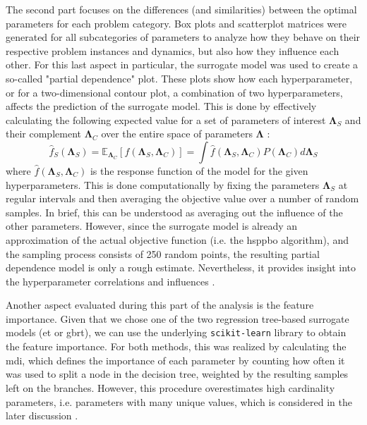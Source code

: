 The second part focuses on the differences (and similarities) between the optimal parameters for each problem category. Box plots and scatterplot matrices were generated for all subcategories of parameters to analyze how they behave on their respective problem instances and dynamics, but also how they influence each other. For this last aspect in particular, the surrogate model was used to create a so-called "partial dependence" plot. These plots show how each hyperparameter, or for a two-dimensional contour plot, a combination of two hyperparameters, affects the prediction of the surrogate model. This is done by effectively calculating the following expected value for a set of parameters of interest $\mathbf{\Lambda}_S$ and their complement $\mathbf{\Lambda}_C$ over the entire space of parameters $\mathbf{\Lambda}$ \cite[Chapter~10.13.2]{hastie2009elements}:
\begin{equation}
	\hat{f}_S (\mathbf{\Lambda}_S) = \mathbb{E}_{\mathbf{\Lambda}_C} \left[ f(\mathbf{\Lambda}_S,\mathbf{\Lambda}_C)\right] = \int \hat{f}(\mathbf{\Lambda}_S,\mathbf{\Lambda}_C) P(\mathbf{\Lambda}_C) d\mathbf{\Lambda}_S
\end{equation}
where $\hat{f}(\mathbf{\Lambda}_S,\mathbf{\Lambda}_C)$ is the response function of the model for the given hyperparameters. This is done computationally by fixing the parameters $\mathbf{\Lambda}_S$ at regular intervals and then averaging the objective value over a number of random samples. In brief, this can be understood as averaging out the influence of the other parameters. However, since the surrogate model is already an approximation of the actual objective function (i.e. the \gls{hsppbo} algorithm), and the sampling process consists of 250 random points, the resulting partial dependence model is only a rough estimate. Nevertheless, it provides insight into the hyperparameter correlations and influences \cite{friedman2001greedy}.

Another aspect evaluated during this part of the analysis is the feature importance. Given that we chose one of the two regression tree-based surrogate models (\gls{et} or \gls{gbrt}), we can use the underlying \texttt{scikit-learn} library to obtain the feature importance. For both methods, this was realized by calculating the \gls{mdi}, which defines the importance of each parameter by counting how often it was used to split a node in the decision tree, weighted by the resulting samples left on the branches. However, this procedure overestimates high cardinality parameters, i.e. parameters with many unique values, which is considered in the later discussion \cite{strobl2007bias}.

